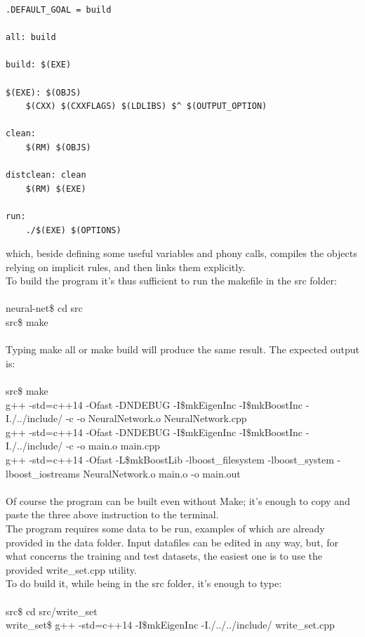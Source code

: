 \documentclass[12pt, a4paper]{report}
\theoremstyle{definition}
\begin{document}
{\begin{lstlisting}[frame=single]
.DEFAULT_GOAL = build

all: build

build: $(EXE)

$(EXE): $(OBJS)
	$(CXX) $(CXXFLAGS) $(LDLIBS) $^ $(OUTPUT_OPTION)

clean:
	$(RM) $(OBJS)

distclean: clean
	$(RM) $(EXE)

run:
	./$(EXE) $(OPTIONS)
\end{lstlisting}
which, beside defining some useful variables and phony calls, compiles the objects relying on implicit rules, and then links them explicitly.\\
To build the program it's thus sufficient to run the makefile in the src folder:\\
{\\ \ttfamily 
	neural-net\$ cd src\\
	src\$ make\\
	\\}
Typing {\ttfamily make all} or {\ttfamily make build} will produce the same result. The expected output is:\\
{\\ \ttfamily 
 src\$ make \\
g++ -std=c++14 -Ofast -DNDEBUG -I\$mkEigenInc -I\$mkBoostInc -I./../include/  -c -o NeuralNetwork.o NeuralNetwork.cpp\\
g++ -std=c++14 -Ofast -DNDEBUG -I\$mkEigenInc -I\$mkBoostInc -I./../include/  -c -o main.o main.cpp\\
g++ -std=c++14 -Ofast -L\$mkBoostLib -lboost\_filesystem -lboost\_system -lboost\_iostreams NeuralNetwork.o main.o -o main.out\\
	\\}
Of course the program can be built even without Make; it's enough to copy and paste the three above instruction to the terminal.\\
The program requires some data to be run, examples of which are already provided in the data folder. Input datafiles can be edited in any way, but, for what concerns the training and test datasets, the easiest one is to use the provided {\ttfamily write\_set.cpp} utility.\\
To do build it, while being in the src folder, it's enough to type:\\
{\\ \ttfamily 
	src\$ cd src/write\_set\\
	write\_set\$ g++ -std=c++14 -I\$mkEigenInc -I./../../include/ write\_set.cpp\\
}}
\end{document}
